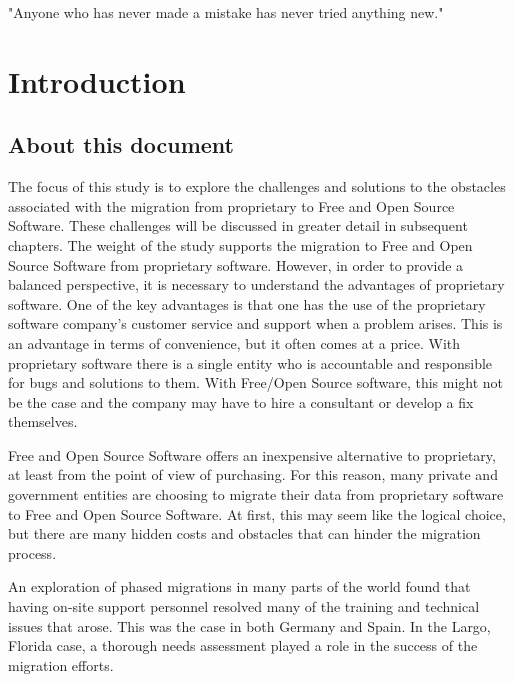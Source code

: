 \newpage
\begin{savequote}[108mm]
 "Anyone who has never made a mistake has never tried anything new." 
\end{savequote}
\chapter{Introduction}
\vspace{-3cm}
\label{chap:introduction}
  \section{About this document}
  \label{sec:about}
  The focus of this study is to explore the challenges and solutions to the obstacles associated with the migration from proprietary to Free and Open Source Software. These challenges will be discussed in greater detail in subsequent chapters. The weight of the study supports the migration to Free and Open Source Software from proprietary software. However, in order to provide a balanced perspective, it is necessary to understand the advantages of proprietary software. One of the key advantages is that one has the use of the proprietary software company's customer service and support when a problem arises. This is an advantage in terms of convenience, but it often comes at a price. With proprietary software there is a single entity who is accountable and responsible for bugs and solutions to them. With Free/Open Source software, this might not be the case and the company may have to hire a consultant or develop a fix themselves.  

  Free and Open Source Software offers an inexpensive alternative to proprietary, at least from the point of view of purchasing. For this reason, many private and government entities are choosing to migrate their data from proprietary software to Free and Open Source Software.  At first, this may seem like the logical choice, but there are many hidden costs and obstacles that can hinder the migration process. 

  An exploration of phased migrations in many parts of the world found that having on-site support personnel resolved many of the training and technical issues that arose. This was the case in both Germany and Spain. In the Largo, Florida case, a thorough needs assessment played a role in the success of the migration efforts.

